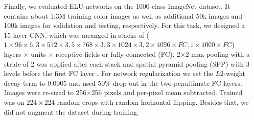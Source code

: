 \documentclass{article}
\begin{document}
Finally, we evaluated ELU-networks on the 1000-class ImageNet dataset.
It contains about 1.3M training color images
as well as additional 50k images and 100k images for validation and
testing, respectively.
For this task, we designed a 15 layer CNN,
which was arranged in stacks of
($1\times96\times6, 3\times512\times3, 5\times768\times3,
3\times1024\times3, 2\times4096\times FC, 1\times1000\times FC$)
layers $\times$ units $\times$ receptive fields or fully-connected (FC).
2$\times$2 max-pooling with a stride of 2 was applied after
each stack and spatial pyramid pooling (SPP) with 3 levels before
the first FC layer \citep{He:15}.
For network regularization we set the $L2$-weight decay term to $0.0005$ and
used 50\% drop-out in the two penultimate FC layers.
Images were re-sized to 256$\times$256 pixels and per-pixel mean subtracted.
Trained was on $224\times224$ random crops with random
horizontal flipping. Besides that, we did not augment the dataset during training.
\end{document}
